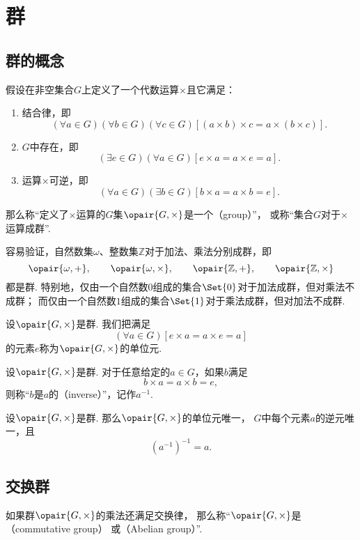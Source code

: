 \section{群}
\subsection{群的概念}
\begin{definition}
假设在非空集合\(G\)上定义了一个代数运算\(\times\)且它满足：
\begin{enumerate}
    \item 结合律，即\[
        (\forall a \in G)(\forall b \in G)(\forall c \in G)
        [(a \times b) \times c = a \times (b \times c)].
    \]

    \item \(G\)中存在，即\[
        (\exists e \in G)(\forall a \in G)
        [e \times a = a \times e = a].
    \]

    \item 运算\(\times\)可逆，即\[
        (\forall a \in G)(\exists b \in G)
        [b \times a = a \times b = e].
    \]
\end{enumerate}
那么称“定义了\(\times\)运算的\(G\)集\(\opair{G,\times}\)是一个（group）”，
或称“集合\(G\)对于\(\times\)运算成群”.
\end{definition}

容易验证，自然数集\(\omega\)、整数集\(\mathbb{Z}\)对于加法、乘法分别成群，即\[
	\opair{\omega,+}, \qquad
	\opair{\omega,\times}, \qquad
	\opair{\mathbb{Z},+}, \qquad
	\opair{\mathbb{Z},\times}
\]都是群.
特别地，仅由一个自然数\(0\)组成的集合\(\Set{0}\)对于加法成群，但对乘法不成群；
而仅由一个自然数\(1\)组成的集合\(\Set{1}\)对于乘法成群，但对加法不成群.

\begin{definition}
设\(\opair{G,\times}\)是群.
我们把满足\[
    (\forall a \in G)
    [e \times a = a \times e = a]
\]的元素\(e\)称为\(\opair{G,\times}\)的单位元.
\end{definition}

\begin{definition}
设\(\opair{G,\times}\)是群.
对于任意给定的\(a \in G\)，如果\(b\)满足\[
    b \times a = a \times b = e,
\]
则称“\(b\)是\(a\)的（inverse）”，记作\(a^{-1}\).
\end{definition}

\begin{property}
设\(\opair{G,\times}\)是群.
那么\(\opair{G,\times}\)的单位元唯一，
\(G\)中每个元素\(a\)的逆元唯一，且\[
    (a^{-1})^{-1} = a.
\]
\end{property}

\subsection{交换群}
\begin{definition}
如果群\(\opair{G,\times}\)的乘法还满足交换律，
那么称“\(\opair{G,\times}\)是（commutative group）%
或（Abelian group）”.
\end{definition}
